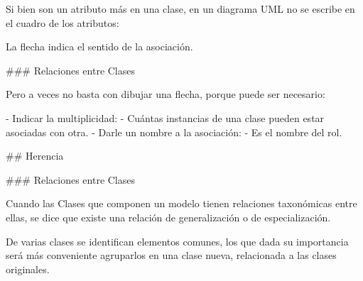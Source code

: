 Si bien son un atributo más en una clase, en un diagrama UML no se escribe en el cuadro de los
atributos:

\vfill

\begin{center}
\end{center}

La flecha indica el sentido de la asociación.

### Relaciones entre Clases


Pero a veces no basta con dibujar una flecha, porque puede ser necesario:

- Indicar la multiplicidad:
    - Cuántas instancias de una clase pueden estar asociadas con otra.
- Darle un nombre a la asociación:
    - Es el nombre del rol.

\vfill
\begin{center}
\end{center}


## Herencia

### Relaciones entre Clases


Cuando las Clases que componen un modelo tienen relaciones taxonómicas entre ellas, se
dice que existe una relación de generalización o de especialización.\newline

\newline

De varias clases se identifican elementos comunes, los que dada su importancia será
más conveniente agruparlos en una clase nueva, relacionada a las clases originales.

